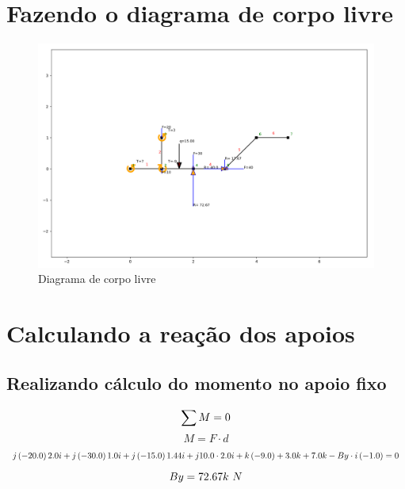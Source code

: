 \documentclass[a4paper,12pt]{article}%
\begin{document}
%
\section{Fazendo o diagrama de corpo livre}%
\label{sec:Fazendoodiagramadecorpolivre}%


\begin{figure}[H]%
\centering%
\includegraphics[width=500px]{figs/diagram1}%
\caption{\label{fig:corpolivre} Diagrama de corpo livre}%
\end{figure}

%
\section{Calculando a reação dos apoios}%
\label{sec:Calculandoareaodosapoios}%
\subsection{Realizando cálculo do momento no apoio fixo}%
\label{subsec:Realizandoclculodomomentonoapoiofixo}%
\begin{dmath*}%
\sum{M} = 0 \\%
\end{dmath*}%
\begin{dmath*}%
M = F \cdot d%
\end{dmath*}%
\begin{dmath*}%
j \left(-20.0\right) 2.0 i + j \left(-30.0\right) 1.0 i + j \left(-15.0\right) 1.44 i + j 10.0 \cdot 2.0 i + k \left(-9.0\right) + 3.0 k + 7.0 k - By \cdot i \left(-1.0\right) = 0 \\%
\end{dmath*}%
\begin{dmath*}%
By = 72.67k$ $N%
\end{dmath*}
\end{document}
